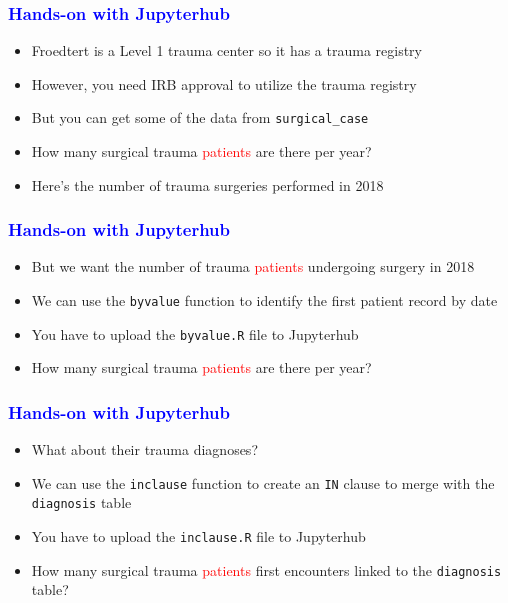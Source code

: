 \documentclass[11pt,pdftex,dvipsnames,usenames]{beamer}
\begin{document}
\begin{frame}[fragile]\frametitle{\bf\textcolor{blue}{Hands-on with Jupyterhub}}

\begin{itemize}
\item Froedtert is a Level 1 trauma center so it has a trauma registry
\item However, you need IRB approval to utilize the trauma registry
\item But you can get some of the data from \texttt{surgical\_case}
\item How many surgical trauma \textcolor{red}{patients} are there per year?

\item Here's the number of trauma surgeries performed in 2018
\end{itemize}

\end{frame}


\begin{frame}[fragile]\frametitle{\bf\textcolor{blue}{Hands-on with Jupyterhub}}
\begin{itemize}
\item But we want the number of trauma \textcolor{red}{patients} undergoing surgery in 2018
\item We can use the \texttt{byvalue} function to identify the first
patient record by date
\item You have to upload the \texttt{byvalue.R} file to Jupyterhub
\item How many surgical trauma \textcolor{red}{patients} are there per year?
\end{itemize}

\end{frame}

\begin{frame}[fragile]\frametitle{\bf\textcolor{blue}{Hands-on with Jupyterhub}}
\begin{itemize}
\item What about their trauma diagnoses?
\item We can use the \texttt{inclause} function to create an \texttt{IN}
clause to merge with the \texttt{diagnosis} table
\item You have to upload the \texttt{inclause.R} file to Jupyterhub
\item How many surgical trauma \textcolor{red}{patients} 
first encounters linked to the \texttt{diagnosis} table?
\end{itemize}

\end{frame}
\end{document}
